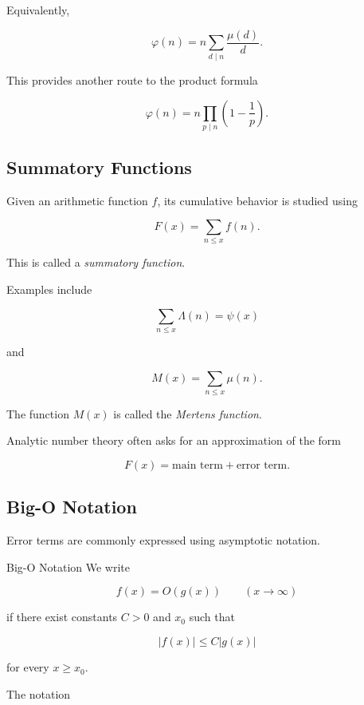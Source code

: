Equivalently,

\[ \boxed{\varphi(n)=n\sum_{d\mid n}\frac{\mu(d)}{d}.} \]

This provides another route to the product formula

\[ \varphi(n)=n\prod_{p\mid n}\left(1-\frac1p\right). \]

\subsection{Summatory Functions}
\label{subsec:summatory-functions}

Given an arithmetic function \(f\), its cumulative behavior is studied using

\[ F(x)=\sum_{n\leq x}f(n). \]

This is called a \emph{summatory function}.

Examples include

\[ \sum_{n\leq x}\Lambda(n)=\psi(x) \]

and

\[ M(x)=\sum_{n\leq x}\mu(n). \]

The function \(M(x)\) is called the \emph{Mertens function}.

Analytic number theory often asks for an approximation of the form

\[ F(x)=\text{main term}+\text{error term}. \]

\subsection{Big-O Notation}
\label{subsec:big-o-number-theory}

Error terms are commonly expressed using asymptotic notation.

\begin{definitionbox}{Big-O Notation}
We write

\[ f(x)=O(g(x))\qquad(x\to\infty) \]

if there exist constants \(C>0\) and \(x_0\) such that

\[ |f(x)|\leq C|g(x)| \]

for every \(x\geq x_0\).
\end{definitionbox}

The notation

